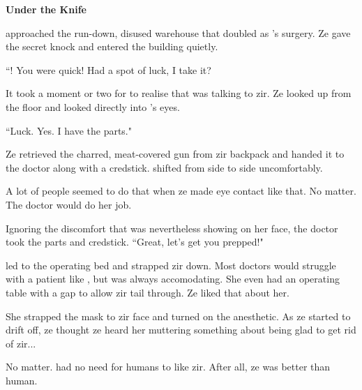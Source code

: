 \textbf{Under the Knife}

\protagonist{} approached the run-down, disused warehouse that doubled as \razordoc{}'s surgery. Ze gave the secret knock and entered the building quietly.

``\protagonist{}! You were quick! Had a spot of luck, I take it?

It took a moment or two for \protagonist{} to realise that \razordoc{} was talking to zir. Ze looked up from the floor and looked directly into \razordoc{}'s eyes.

``Luck. Yes. I have the parts."

Ze retrieved the charred, meat-covered gun from zir backpack and handed it to the doctor along with a credstick. \razordoc{} shifted from side to side uncomfortably.

A lot of people seemed to do that when ze made eye contact like that. No matter. The doctor would do her job.

Ignoring the discomfort that was nevertheless showing on her face, the doctor took the parts and credstick. ``Great, let's get you prepped!"

\razordoc{} led \protagonist{} to the operating bed and strapped zir down. Most doctors would struggle with a patient like \protagonist{}, but \razordoc{} was always accomodating. She even had an operating table with a gap to allow zir tail through. Ze liked that about her.

She strapped the mask to zir face and turned on the anesthetic. As ze started to drift off, ze thought ze heard her muttering something about being glad to get rid of zir...

No matter. \protagonist{} had no need for humans to like zir. After all, ze was better than human.

%
